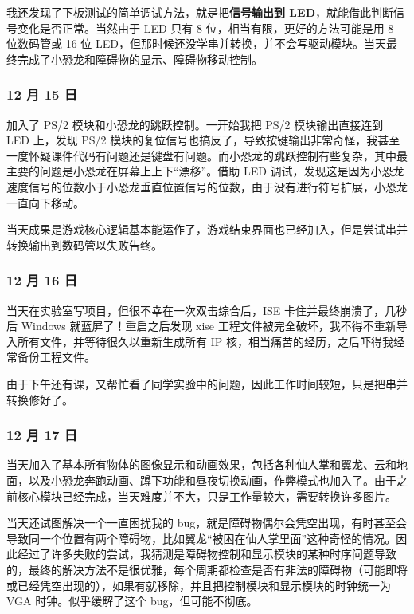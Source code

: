 \documentclass[hyperref,UTF8,12pt,a4paper]{ctexart}
\begin{document}
我还发现了下板测试的简单调试方法，就是把\textbf{信号输出到
LED}，就能借此判断信号变化是否正常。当然由于 LED 只有 8
位，相当有限，更好的方法可能是用 8 位数码管或 16 位
LED，但那时候还没学串并转换，并不会写驱动模块。当天最终完成了小恐龙和障碍物的显示、障碍物移动控制。

\hypertarget{ux6708-15-ux65e5}{%
\subsubsection{12 月 15 日}\label{ux6708-15-ux65e5}}

加入了 PS/2 模块和小恐龙的跳跃控制。一开始我把 PS/2 模块输出直接连到 LED
上，发现 PS/2
模块的复位信号也搞反了，导致按键输出非常奇怪，我甚至一度怀疑课件代码有问题还是键盘有问题。而小恐龙的跳跃控制有些复杂，其中最主要的问题是小恐龙在屏幕上上下``漂移''。借助
LED
调试，发现这是因为小恐龙速度信号的位数小于小恐龙垂直位置信号的位数，由于没有进行符号扩展，小恐龙一直向下移动。

当天成果是游戏核心逻辑基本能运作了，游戏结束界面也已经加入，但是尝试串并转换输出到数码管以失败告终。

\hypertarget{ux6708-16-ux65e5}{%
\subsubsection{12 月 16 日}\label{ux6708-16-ux65e5}}

当天在实验室写项目，但很不幸在一次双击综合后，ISE
卡住并最终崩溃了，几秒后 Windows 就蓝屏了！重启之后发现 xise
工程文件被完全破坏，我不得不重新导入所有文件，并等待很久以重新生成所有
IP 核，相当痛苦的经历，之后吓得我经常备份工程文件。

由于下午还有课，又帮忙看了同学实验中的问题，因此工作时间较短，只是把串并转换修好了。

\hypertarget{ux6708-17-ux65e5}{%
\subsubsection{12 月 17 日}\label{ux6708-17-ux65e5}}

当天加入了基本所有物体的图像显示和动画效果，包括各种仙人掌和翼龙、云和地面，以及小恐龙奔跑动画、蹲下功能和昼夜切换动画，作弊模式也加入了。由于之前核心模块已经完成，当天难度并不大，只是工作量较大，需要转换许多图片。

当天还试图解决一个一直困扰我的
bug，就是障碍物偶尔会凭空出现，有时甚至会导致同一个位置有两个障碍物，比如翼龙``被困在仙人掌里面''这种奇怪的情况。因此经过了许多失败的尝试，我猜测是障碍物控制和显示模块的某种时序问题导致的，最终的解决方法不是很优雅，每个周期都检查是否有非法的障碍物（可能即将或已经凭空出现的），如果有就移除，并且把控制模块和显示模块的时钟统一为
VGA 时钟。似乎缓解了这个 bug，但可能不彻底。
\end{document}
